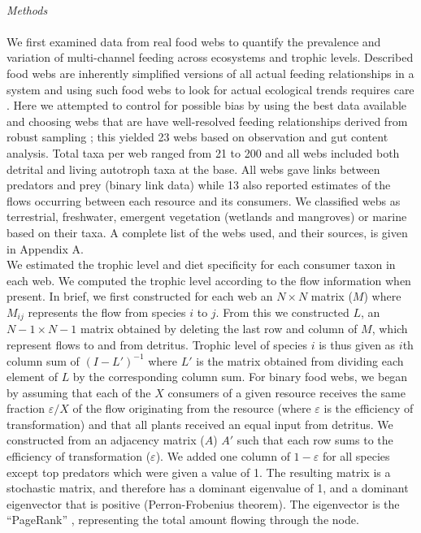 \documentclass[12pt,a4paper,oneside]{article}
\begin{document}
\\
\emph{Methods}\\
\\
\indent We first examined data from real food webs to quantify the prevalence and
variation of multi-channel feeding across ecosystems and trophic levels.
Described food webs are inherently simplified versions of all actual
feeding relationships in a system and using such food webs to look for
actual ecological trends requires care \citep{Dunne:2004,
  Martinez:1991}. Here we attempted to control for possible bias by using the
best data available and choosing webs that are have well-resolved feeding relationships derived from robust sampling \citep{Martinez:1999}; this yielded
23 webs based on observation and gut content analysis. Total taxa per
web ranged from 21 to 200 and all webs included both detrital and
living autotroph taxa at the base. All webs gave links between
predators and prey (binary link data) while 13 also reported estimates
of the flows occurring between each resource and its
consumers. We classified webs as terrestrial, freshwater, emergent
vegetation (wetlands and mangroves)
or marine based on their taxa. A complete list of the webs used, and
their sources, is given in Appendix A.
\\
\indent We estimated the trophic level
and diet specificity for each consumer taxon in each web. We computed the trophic
level according to the flow
information \citep{Levine:1980} when present. In brief, we first constructed for each web an \(N \times N\) matrix (\(M\)) where \(M_{ij}\) represents the flow from species \(i\) to \(j\). From this we constructed \(L\), an  \(N-1 \times N-1\) matrix obtained by deleting the last row and column of \(M\), which represent flows to and from detritus. Trophic level of species \(i\) is thus given as \(i\)th column sum of \((I-L')^{-1}\) where \(L'\) is the matrix obtained from dividing each element of \(L\) by the corresponding column sum. For binary food webs,
we began by assuming that each of the \(X\) consumers of a given resource receives the same fraction
\(\varepsilon/X\) of the flow originating from the resource (where \(\varepsilon\) is the efficiency of transformation) and that all plants received an equal input from detritus. We constructed from an adjacency matrix (\(A\)) \(A'\) such that each row sums to the efficiency of transformation (\(\varepsilon\)). We added one column of \(1-\varepsilon\) for all species except top predators which were given a value of 1. The resulting matrix is a stochastic matrix, and therefore has a dominant eigenvalue of 1, and a dominant eigenvector that is positive (Perron-Frobenius theorem). The eigenvector is the ``PageRank'' \citep{Allesina:2009}, representing the total amount flowing through the node. 
\end{document}
